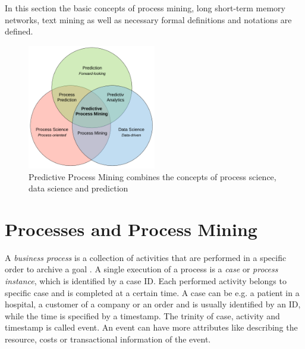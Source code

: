 In this section the basic concepts of process mining, long short-term memory networks, text mining as well as necessary formal definitions and notations are defined.


\begin{figure}
	\centering
	\includegraphics[width=0.5\textwidth]{figures/predictive-process-mining}
	\caption{Predictive Process Mining combines the concepts of process science, data science and prediction}
\end{figure}


\section{Processes and Process Mining}

A \textit{business process} is a collection of activities that are performed in a specific order to archive a goal \cite{DBLP:conf/bpm/AalstAM11}.
A single execution of a process is a \textit{case} or \textit{process instance}, which is identified by a case ID.
Each performed activity belongs to specific case and is completed at a certain time.
A case can be e.g. a patient in a hospital, a customer of a company or an order and is usually identified by an ID, while 
the time is specified by a timestamp.
The trinity of case, activity and timestamp is called event.
An event can have more attributes like describing the resource, costs or transactional information of the event.

